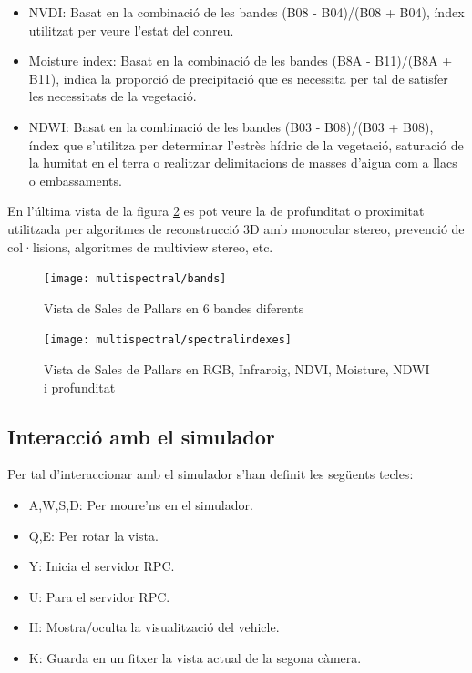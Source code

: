 \documentclass[10pt,a4paper,twocolumn,twoside]{article}
\begin{document}
\begin{itemize}
\item 
{
	NVDI\cite{ndvi}: Basat en la combinació de les bandes (B08 - B04)/(B08 + B04), índex utilitzat per veure l'estat del conreu.
}
\item
{
	Moisture index\cite{moisture}: Basat en la combinació de les bandes (B8A - B11)/(B8A + B11), indica la proporció de precipitació que es necessita per tal de satisfer les necessitats de la vegetació.
}
\item
{
	NDWI\cite{ndwi}: Basat en la combinació de les bandes (B03 - B08)/(B03 + B08), índex que s'utilitza per determinar l'estrès hídric de la vegetació, saturació de la humitat en el terra o realitzar delimitacions de masses d'aigua com a llacs o embassaments.
}
\end{itemize} 

En l'última vista de la figura \ref{fig-spectralindexes} es pot veure la de profunditat o proximitat utilitzada per algoritmes de reconstrucció 3D amb monocular stereo, prevenció de col·lisions, algoritmes de multiview stereo, etc.

\begin{figure}[!h]
\centering
  	\texttt{[image: multispectral/bands]}
	\caption{Vista de Sales de Pallars en 6 bandes diferents}
	\label{fig-bands}
\end{figure}

\begin{figure}[!h]
\centering
  	\texttt{[image: multispectral/spectralindexes]}
	\caption{Vista de Sales de Pallars en RGB, Infraroig, NDVI, Moisture, NDWI i profunditat}
	\label{fig-spectralindexes}
\end{figure}

\subsection{Interacció amb el simulador}
Per tal d'interaccionar amb el simulador s'han definit les següents tecles:

\begin{itemize}
\item A,W,S,D: Per moure'ns en el simulador.
\item Q,E: Per rotar la vista.
\item Y: Inicia el servidor RPC.
\item U: Para el servidor RPC.
\item H: Mostra/oculta la visualització del vehicle.
\item K: Guarda en un fitxer la vista actual de la segona càmera.
\end{itemize}
\end{document}
